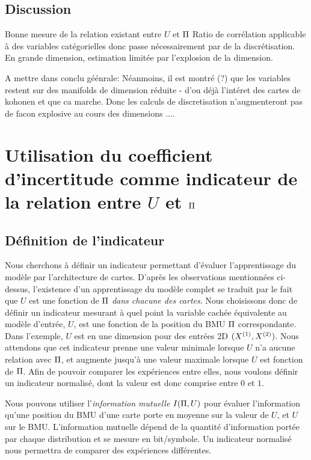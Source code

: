 \documentclass[../main]{subfiles}
\begin{document}
\subsection{Discussion}
Bonne mesure de la relation existant entre $U$ et $\Pi$
Ratio de corrélation applicable à des variables catégorielles donc passe nécessairement par de la discrétisation.
En grande dimension, estimation limitée par l'explosion de la dimension.

A mettre dans conclu géénrale: 
Néanmoins, il est montré (?) que  les variables restent sur des manifolds de dimension réduite - d'ou déjà l'intéret des cartes de kohonen et que ca marche. Donc les calculs de discretisation n'augmenteront pas de facon explosive au cours des dimensions ....


\section{Utilisation du coefficient d'incertitude comme indicateur de la relation entre $U$ et $\Pi$}

\subsection{Définition de l'indicateur}

Nous cherchons à définir un indicateur permettant d'évaluer l'apprentissage du modèle par l'architecture de cartes. D'après les observations mentionnées ci-dessus, l'existence d'un apprentissage du modèle complet se traduit par le fait que $U$ est une fonction de $\Pi$ \emph{dans chacune des cartes}.
Nous choisissons donc de définir un indicateur mesurant à quel point la variable cachée équivalente au modèle d'entrée, $U$, est une fonction de la position du BMU $\Pi$ correspondante.
Dans l'exemple, $U$ est en une dimension pour des entrées 2D $(X^{({1})},X^{({2})})$.
Nous attendons que cet indicateur prenne une valeur minimale lorsque $U$ n'a aucune relation avec $\Pi$, et augmente jusqu'à une valeur maximale lorsque $U$ est fonction de $\Pi$. Afin de pouvoir comparer les expériences entre elles, nous voulons définir un indicateur normalisé, dont la valeur est donc comprise entre $0$ et $1$.

Nous pouvons utiliser l'\emph{information mutuelle} $I(\Pi, U)$ pour évaluer l'information qu'une position du BMU d'une carte porte en moyenne sur la valeur de $U$, et $U$ sur le BMU.
L'information mutuelle dépend de la quantité d'information portée par chaque distribution et se mesure en bit/symbole. Un indicateur normalisé nous permettra de comparer des expériences différentes. 
\end{document}
